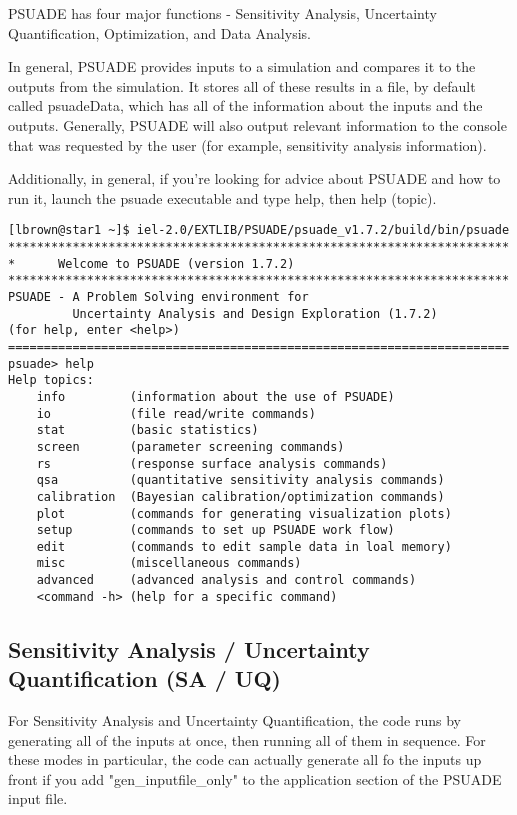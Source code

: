 PSUADE has four major functions - Sensitivity Analysis, Uncertainty Quantification, Optimization, and Data Analysis.

In general, PSUADE provides inputs to a simulation and compares it to the outputs from the simulation. It stores all of these results in a file, by default called psuadeData, which has all of the information about the inputs and the outputs. Generally, PSUADE will also output relevant information to the console that was requested by the user (for example, sensitivity analysis information).

Additionally, in general, if you're looking for advice about PSUADE and how to run it, launch the psuade executable and type help, then help (topic).

\begin{verbatim}
[lbrown@star1 ~]$ iel-2.0/EXTLIB/PSUADE/psuade_v1.7.2/build/bin/psuade 
**********************************************************************
*      Welcome to PSUADE (version 1.7.2)
**********************************************************************
PSUADE - A Problem Solving environment for 
         Uncertainty Analysis and Design Exploration (1.7.2)
(for help, enter <help>)
======================================================================
psuade> help
Help topics:
	info         (information about the use of PSUADE)
	io           (file read/write commands)
	stat         (basic statistics)
	screen       (parameter screening commands)
	rs           (response surface analysis commands)
	qsa          (quantitative sensitivity analysis commands)
	calibration  (Bayesian calibration/optimization commands)
	plot         (commands for generating visualization plots)
	setup        (commands to set up PSUADE work flow)
	edit         (commands to edit sample data in loal memory)
	misc         (miscellaneous commands)
	advanced     (advanced analysis and control commands)
	<command -h> (help for a specific command)
\end{verbatim}

\subsection{Sensitivity Analysis / Uncertainty Quantification (SA / UQ)}

For Sensitivity Analysis and Uncertainty Quantification, the code runs by generating all of the inputs at once, then running all of them in sequence. For these modes in particular, the code can actually generate all fo the inputs up front if you add "gen\_inputfile\_only" to the application section of the PSUADE input file.

